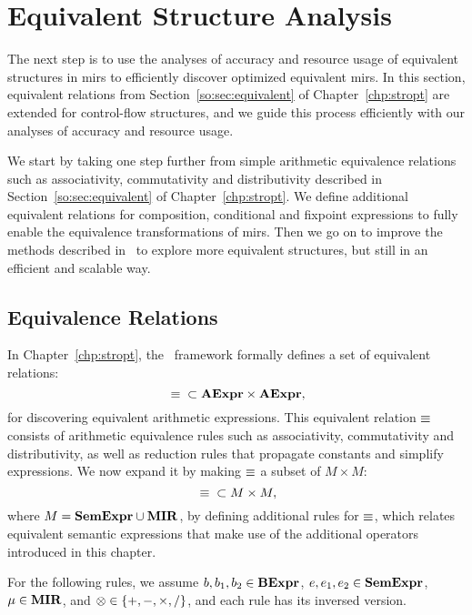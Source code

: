 \section{Equivalent Structure Analysis}
\label{po:sec:equivalence_analysis}

The next step is to use the analyses of accuracy and resource usage of
equivalent structures in \glspl{mir} to efficiently discover optimized
equivalent \glspl{mir}.  In this section, equivalent relations from
Section~\ref{so:sec:equivalent} of Chapter~\ref{chp:stropt} are extended
for control-flow structures, and we guide this process efficiently with our
analyses of accuracy and resource usage.

We start by taking one step further from simple arithmetic equivalence
relations such as associativity, commutativity and distributivity described
in Section~\ref{so:sec:equivalent} of Chapter~\ref{chp:stropt}.  We define
additional equivalent relations for composition, conditional and fixpoint
expressions to fully enable the equivalence transformations of \glspl{mir}.
Then we go on to improve the methods described in \soap~to explore more
equivalent structures, but still in an efficient and scalable way.


\subsection{Equivalence Relations}

In Chapter~\ref{chp:stropt}, the \soap~framework formally defines a set of
equivalent relations:
\begin{equation}
    {{}\ensuremath\equiv{}} \subset \mathbf{AExpr} \times \mathbf{AExpr},
\end{equation}
for discovering equivalent arithmetic expressions.  This equivalent relation
$\equiv$ consists of arithmetic equivalence rules such as associativity,
commutativity and distributivity, as well as reduction rules that propagate
constants and simplify expressions.  We now expand it by making $\equiv$ a
subset of $M \times M$:
\begin{equation}
    {{}\ensuremath\equiv{}} \subset M \times M,
\end{equation}
where $M = \mathbf{SemExpr} \cup \mathbf{MIR}$, by defining additional rules for $\equiv$,
which relates equivalent semantic expressions that make use of the additional
operators introduced in this chapter.

For the following rules, we assume $b, b_1, b_2 \in \mathbf{BExpr}$, $e, e_1, e_2
\in \mathbf{SemExpr}$, $\mu \in \mathbf{MIR}$, and $\otimes \in \{+, -, \times, /\}$, and
each rule has its inversed version.

